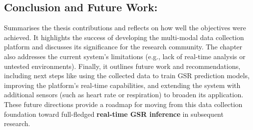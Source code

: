 \subsection{Conclusion and Future Work:} Summarises the thesis contributions and reflects on how well the objectives were achieved. It highlights the success of developing the multi-modal data collection platform and discusses its significance for the research community. The chapter also addresses the current system's limitations (e.g., lack of real-time analysis or untested environments). Finally, it outlines future work and recommendations, including next steps like using the collected data to train GSR prediction models, improving the platform's real-time capabilities, and extending the system with additional sensors (such as heart rate or respiration) to broaden its application. These future directions provide a roadmap for moving from this data collection foundation toward full-fledged \textbf{real-time GSR inference} in subsequent research.
